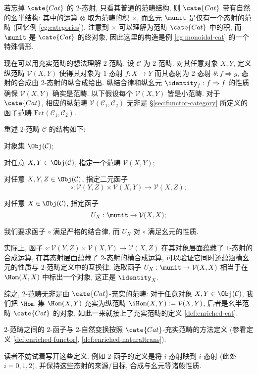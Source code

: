 若忘掉 $\cate{Cat}$ 的 $2$-态射, 只看其普通的范畴结构, 则 $\cate{Cat}$ 带有自然的幺半结构: 其中的运算 $\otimes$ 取为范畴的积 $\times$, 而幺元 $\munit$ 是仅有一个态射的范畴 (回忆例 \ref{eg:categories}). 注意到 $\times$ 可以理解为范畴 $\cate{Cat}$ 中的积, 而 $\munit$ 是 $\cate{Cat}$ 的终对象, 因此这里的构造是例 \ref{eg:monoidal-cat} 的一个特殊情形.

\begin{remark}
	现在可以用充实范畴的想法理解 $2$-范畴. 设 $\mathcal{C}$ 为 $2$-范畴. 对其任意对象 $X, Y$, 定义纵范畴 $\mathcal{V}(X, Y)$ 使得其对象为 $1$-态射 $f: X \to Y$ 而其态射为 $2$-态射 $\theta: f \Rightarrow g$, 态射的合成由 $2$-态射的纵合成给出. 纵结合律和纵幺元 $\identity_f: f \Rightarrow f$ 的性质确保 $\mathcal{V}(X, Y)$ 确实是范畴. 以下假设每个 $\mathcal{V}(X, Y)$ 皆是小范畴. 对于 $\cate{Cat}$, 相应的纵范畴 $\mathcal{V}(\mathcal{C}_1, \mathcal{C}_2)$ 无非是 \S\ref{sec:functor-category} 所定义的函子范畴 $\text{Fct}(\mathcal{C}_1, \mathcal{C}_2)$.

	重述 $2$-范畴 $\mathcal{C}$ 的结构如下:
	\begin{compactitem}
		\item 对象集 $\Obj(\mathcal{C})$;
		\item 对任意 $X, Y \in \Obj(\mathcal{C})$, 指定一个范畴 $\mathcal{V}(X, Y)$;
		\item 对任意 $X, Y, Z \in \Obj(\mathcal{C})$, 指定二元函子
			\[ \circ: \mathcal{V}(Y, Z) \times \mathcal{V}(X, Y) \to \mathcal{V}(X, Z); \]
		\item 对任意 $X \in \Obj(\mathcal{C})$, 指定函子
			\[ U_X: \munit \to \mathcal{V}(X, X); \]
		\item 我们要求函子 $\circ$ 满足严格的结合律, 而 $U_X$ 对 $\circ$ 满足幺元的性质.
	\end{compactitem}
	实际上, 函子 $\circ: \mathcal{V}(Y, Z) \times \mathcal{V}(X, Y) \to \mathcal{V}(X, Z)$ 在其对象层面蕴藏了 $1$-态射的合成运算, 在其态射层面蕴藏了 $2$-态射的横合成运算, 可以验证它同时还蕴涵横幺元的性质与 $2$-范畴定义中的互换律. 选取函子 $U_X: \munit \to \mathcal{V}(X, X)$ 相当于在 $\Hom(X, X)$ 中标出一个对象, 这正是 $\identity_X$.

	综之, $2$-范畴无非是由 $\cate{Cat}$-充实的范畴: 对于任意对象 $X, Y \in \Obj(\mathcal{C})$, 我们把 $\Hom$-集 $\Hom(X, Y)$ 充实为纵范畴 $\iHom(X, Y) := \mathcal{V}(X, Y)$, 后者是幺半范畴 $\cate{Cat}$ 的对象, 如此一来就接上了充实范畴的定义 \ref{def:enriched-cat}.
\end{remark}

\begin{definition}
	$2$-范畴之间的 $2$-函子与 $2$-自然变换按照 $\cate{Cat}$-充实范畴的方法定义 (参看定义 \ref{def:enriched-functor}, \ref{def:enriched-naturaltrans}).
\end{definition}
读者不妨试着写开这些定义. 例如 $2$-函子的定义是将 $i$-态射映到 $i$-态射 (此处 $i=0,1,2$), 并保持这些态射的来源/目标, 合成与幺元等诸般性质.

